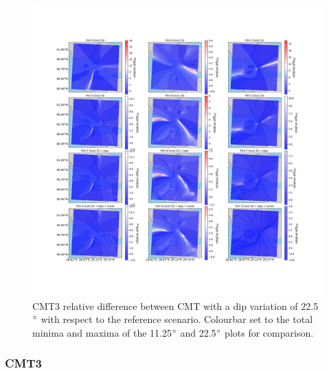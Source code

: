 \documentclass[../Text/00main.tex]{subfiles}
\begin{document}
\begin{figure}[!h]
    \centering
    \includegraphics[width=1\linewidth,trim = 2cm 5cm 1cm 5cm, clip]{images_results/dip_variation_epsilon25_sc2.png}
    \caption{CMT3 relative difference between CMT with a dip variation of 22.5$\degree$ with respect to the reference scenario. Colourbar set to the total minima and maxima of the 11.25$\degree$ and 22.5$\degree$ plots for comparison.}
    \label{fig:ref_eps25-2}
\end{figure}

\subsubsection{CMT3}
\end{document}
